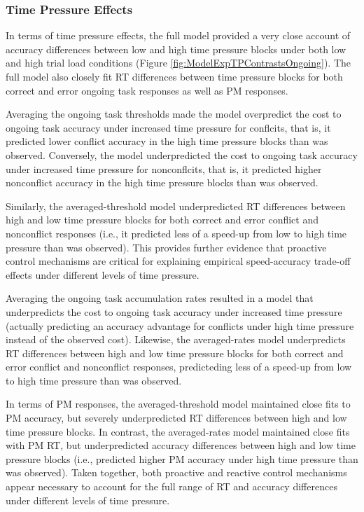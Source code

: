 \documentclass[11pt,]{article}
\begin{document}
\subsubsection{Time Pressure Effects}\label{time-pressure-effects}

In terms of time pressure effects, the full model provided a very close
account of accuracy differences between low and high time pressure
blocks under both low and high trial load conditions (Figure
\ref{fig:ModelExpTPContrastsOngoing}). The full model also closely fit
RT differences between time pressure blocks for both correct and error
ongoing task responses as well as PM responses.

Averaging the ongoing task thresholds made the model overpredict the
cost to ongoing task accuracy under increased time pressure for
conflcits, that is, it predicted lower conflict accuracy in the high
time pressure blocks than was observed. Conversely, the model
underpredicted the cost to ongoing task accuracy under increased time
pressure for nonconflcits, that is, it predicted higher nonconflict
accuracy in the high time pressure blocks than was observed.

Similarly, the averaged-threshold model underpredicted RT differences
between high and low time pressure blocks for both correct and error
conflict and nonconflict responses (i.e., it predicted less of a
speed-up from low to high time pressure than was observed). This
provides further evidence that proactive control mechanisms are critical
for explaining empirical speed-accuracy trade-off effects under
different levels of time pressure.

Averaging the ongoing task accumulation rates resulted in a model that
underpredicts the cost to ongoing task accuracy under increased time
pressure (actually predicting an accuracy advantage for conflicts under
high time pressure instead of the observed cost). Likewise, the
averaged-rates model underpredicts RT differences between high and low
time pressure blocks for both correct and error conflict and nonconflict
responses, predicteding less of a speed-up from low to high time
pressure than was observed.

In terms of PM responses, the averaged-threshold model maintained close
fits to PM accuracy, but severely underpredicted RT differences between
high and low time pressure blocks. In contrast, the averaged-rates model
maintained close fits with PM RT, but underpredicted accuracy
differences between high and low time pressure blocks (i.e., predicted
higher PM accuracy under high time pressure than was observed). Taken
together, both proactive and reactive control mechanisms appear
necessary to account for the full range of RT and accuracy differences
under different levels of time pressure.
\end{document}
